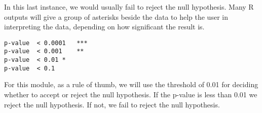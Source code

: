 In this last instance, we would usually fail to reject the null hypothesis. Many R outputs will give a group of asterisks beside the data to help the user in interpreting the data, depending on how significant the result is.

\begin{verbatim}
p-value  < 0.0001  	***
p-value  < 0.001	**
p-value  < 0.01	*
p-value  < 0.1
\end{verbatim}

For this module, as a rule of thumb, we will use the threshold of 0.01 for deciding whether to accept or reject the null hypothesis. If the p-value is less than 0.01 we reject the null hypothesis. If not, we fail to reject the null hypothesis.



